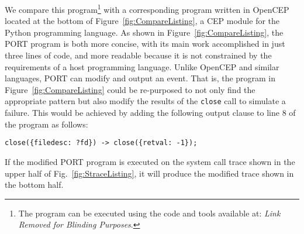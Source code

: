 We compare this program\footnote{The program can be executed using the code and tools available at: \textit{Link Removed for Blinding Purposes}.}
with a corresponding program written in OpenCEP~\cite{open_cep_website} located at the bottom of Figure~\ref{fig:CompareListing},
a CEP module for the Python programming language.
As shown in Figure~\ref{fig:CompareListing},
the PORT program is both more concise, with its main work accomplished in just
three lines of code, and more readable because it is not constrained by the
requirements of a host programming language.
Unlike  OpenCEP and similar languages, PORT can modify and output an event.
That is, the program in Figure~\ref{fig:CompareListing} could be
re-purposed to not only find the appropriate pattern but also modify the
results of the {\tt close} call to simulate a failure.
This would be achieved
by adding the following output clause to line 8 of the program
as follows:
\begin{lstlisting}[numbers=none,xleftmargin=0em,gobble=2]
  close({filedesc: ?fd}) -> close({retval: -1});
\end{lstlisting}
If the modified PORT program is executed on the system call trace shown in the upper half of Fig.~\ref{fig:StraceListing}, it will produce the modified trace shown in the bottom half.







